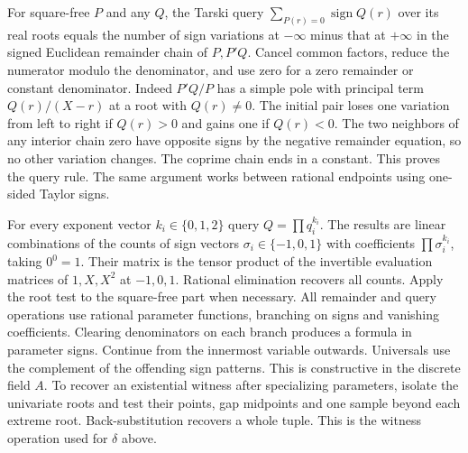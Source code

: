 \documentclass[10pt,letterpaper]{article}
\begin{document}
For square-free $P$ and any $Q$, the Tarski query
$\sum_{P(r)=0}\operatorname{sign}Q(r)$ over its real roots equals
the number of sign variations at $-\infty$ minus that at $+\infty$
in the signed Euclidean remainder chain of $P,P'Q$. Cancel common
factors, reduce the numerator modulo the denominator, and use zero
for a zero remainder or constant denominator. Indeed $P'Q/P$ has
a simple pole with principal term $Q(r)/(X-r)$ at a root with
$Q(r)\ne0$. The initial pair loses one variation from left to right
if $Q(r)>0$ and gains one if $Q(r)<0$. The two neighbors of any
interior chain zero have opposite signs by the negative remainder
equation, so no other variation changes. The coprime chain ends in a
constant. This proves the query rule. The same argument works between
rational endpoints using one-sided Taylor signs.

For every exponent vector $k_i\in\{0,1,2\}$ query
$Q=\prod q_i^{k_i}$. The results are linear combinations of the counts
of sign vectors $\sigma_i\in\{-1,0,1\}$ with coefficients
$\prod\sigma_i^{k_i}$, taking $0^0=1$. Their matrix is the tensor
product of the invertible evaluation matrices of $1,X,X^2$ at
$-1,0,1$. Rational elimination recovers all counts. Apply the root
test to the square-free part when necessary. All remainder and query
operations use rational parameter functions, branching on signs and
vanishing coefficients. Clearing denominators on each branch produces
a formula in parameter signs. Continue from the innermost variable
outwards. Universals use the complement of the offending sign
patterns. This is constructive in the discrete field $A$. To recover
an existential witness after specializing parameters, isolate the
univariate roots and test their points, gap midpoints and one sample
beyond each extreme root. Back-substitution recovers a whole tuple.
This is the witness operation used for $\delta$ above.
\end{document}
